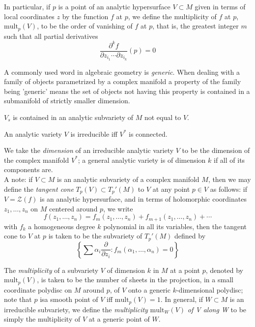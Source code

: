 \indent In particular, if $p$ is a point of an analytic hypersurface $V \subset M$ given in terms of local coordinates $z$ by the function $f$ at $p$, we define the multiplicity of $f$ at $p$, $ \mathrm{mult}_p (V)$, to be the order of vanishing of $f$ at $p$, that is, the greatest integer $m$ such that all partial derivatives
\[
	\frac{ \partial^k f }{\partial z_{i_1} \cdots \partial z_{i_k} } (p)=0
\]


\begin{defn}

A commonly used word in algebraic geometry is \textit{generic}. When dealing with a family of objects parametrized by a complex manifold a property of the family being 'generic' means the set of objects not having this property is contained in a submanifold of strictly smaller dimension.

\end{defn}



\begin{prop}

$V_s$ is contained in an analytic subvariety of $M$ not equal to $V$.

\end{prop}


\begin{prop}

An analytic variety $V$ is irreducible iff $V^*$ is connected.

\end{prop}

We take the \textit{dimension} of an irreducible analytic variety $V$ to be the dimension of the complex manifold $V^*$; a general analytic variety is of dimension $k$ if all of its components are. \\
\indent A note: if $V \subset M$ is an analytic subvariety of a complex manifold $M$, then we may define the \textit{tangent cone} $T_p(V) \subset T_p'(M)$ to $V$ at any point $p \in V$ as follows: if $V = \mathcal{Z}(f)$ is an analytic hypersurface, and in terms of holomorphic coordinates $z_1, \ldots, z_n$ on $M$ centered around $p$, we write
\[
	f(z_1, \ldots, z_n) = f_m(z_1, \ldots, z_n) + f_{m+1} (z_1, \ldots, z_n) + \cdots
\]
with $f_k$ a homogeneous degree $k$ polynomial in all its variables, then the tangent cone to $V$ at $p$ is taken to be the subvariety of $T_p'(M)$ defined by 
\[
	\left\{ \sum \alpha_i \frac{ \partial  }{\partial z_i } : f_m(\alpha_1, \ldots, \alpha_n) = 0 \right\} 
\]

The \textit{multiplicity} of a subvariety $V$ of dimension $k$ in $M$ at a point $p$, denoted by $\mathrm{mult}_p(V)$, is taken to be the number of sheets in the projection, in a small coordinate polydisc on $M$ around $p$, of $V$ onto a generic $k$-dimensional polydisc; note that $p$ isa smooth point of $V$ iff $ \mathrm{mult}_p(V) = 1$. In general, if $W \subset M$ is an irreducible subvariety, we define the \textit{multiplicity} $\mathrm{mult}_W(V)$ \textit{of V along W} to be simply the multiplicity of $V$ at a generic point of $W$.

